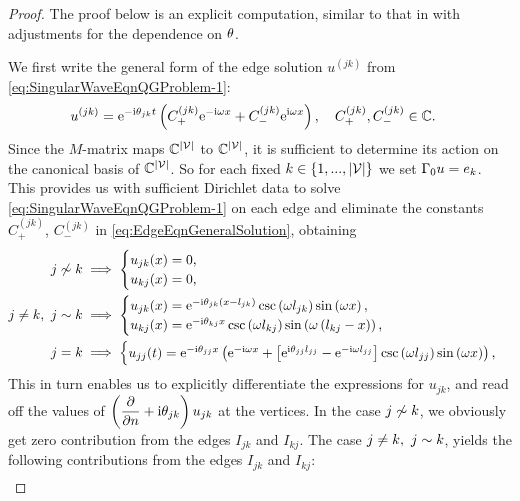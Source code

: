 \begin{proof}
	The proof below is an explicit computation, similar to that in \cite{ershova2014isospectrality} with adjustments for the dependence on $\theta$.
	
	We first write the general form of the edge solution $u^{(jk)}$ from \eqref{eq:SingularWaveEqnQGProblem-1}:
	\begin{align} \label{eq:EdgeEqnGeneralSolution}
		u^{(jk)} &= \mathrm{e}^{-\mathrm{i}\theta_{jk}t}\left(  C_{+}^{(jk)}\mathrm{e}^{-\mathrm{i}\omega x} + C_{-}^{(jk)}\mathrm{e}^{\mathrm{i}\omega x}  \right),
		\quad C_{+}^{(jk)}, C_{-}^{(jk)}\in\mathbb{C}.
	\end{align}
	Since the $M$-matrix maps $\mathbb{C}^{\left\lvert \mathcal{V} \right\rvert}$ to $\mathbb{C}^{\left\lvert \mathcal{V} \right\rvert}$, it is sufficient to determine its action on the canonical basis of $\mathbb{C}^{\left\lvert \mathcal{V} \right\rvert}$.
	So for each fixed $k\in\left\{ 1,...,\left\lvert \mathcal{V} \right\rvert \right\}$ we set $\Gamma_0 u = e_k$.
	This provides us with sufficient Dirichlet data to solve \eqref{eq:SingularWaveEqnQGProblem-1} on each edge and eliminate the constants $C_{+}^{(jk)}$, $C_{-}^{(jk)}$ in \eqref{eq:EdgeEqnGeneralSolution}, obtaining
	\begin{align*}
		j\not\sim k &\implies
		\begin{cases}
			u_{jk}(x) = 0, \\
			u_{kj}(x) = 0,
		\end{cases} \\
		j\neq k, \ j\sim k &\implies
		\begin{cases}
			u_{jk}(x) = \mathrm{e}^{-\mathrm{i}\theta_{jk}\left( x-l_{jk} \right)}\csc\left( \omega l_{jk} \right)\sin\left( \omega x \right), \\
			u_{kj}(x) = \mathrm{e}^{-\mathrm{i}\theta_{kj}x}\csc\left( \omega l_{kj} \right)\sin\left( \omega \left( l_{kj}-x \right) \right),
		\end{cases} \\
		j = k &\implies 
		\begin{cases}
			u_{jj}(t) = \mathrm{e}^{-\mathrm{i}\theta_{jj}x} \left(  \mathrm{e}^{-\mathrm{i}\omega x} + \left[ \mathrm{e}^{\mathrm{i}\theta_{jj}l_{jj}}-\mathrm{e}^{-\mathrm{i}\omega l_{jj}} \right]\csc\left( \omega l_{jj} \right)\sin\left( \omega x \right)   \right),
		\end{cases}
	\end{align*}
	This in turn enables us to explicitly differentiate the expressions for $u_{jk}$, and read off the values of $\left( \dfrac{\partial }{\partial n}+\mathrm{i}\theta_{jk} \right)u_{jk}$ at the vertices.
	In the case $j\not\sim k$, we obviously get zero contribution from the edges $I_{jk}$ and $I_{kj}$.
	The case $j\neq k, \ j\sim k$, yields the following contributions from the edges $I_{jk}$ and $I_{kj}$:
	\begin{align*}

\end{align*}
\end{proof}
